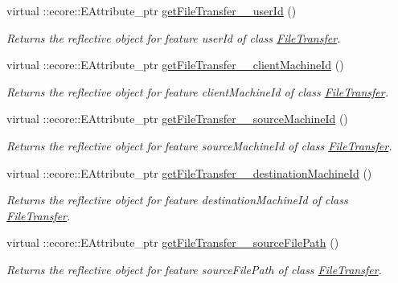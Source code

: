 \begin{DoxyCompactItemize}
virtual ::ecore::EAttribute\_\-ptr \hyperlink{classFMS__Data_1_1FMS__DataPackage_a4089f883855fc62ef871daaab37e93a5}{getFileTransfer\_\-\_\-userId} ()
\begin{DoxyCompactList}\small\item\em Returns the reflective object for feature userId of class \hyperlink{classFMS__Data_1_1FileTransfer}{FileTransfer}. \item\end{DoxyCompactList}\item 
virtual ::ecore::EAttribute\_\-ptr \hyperlink{classFMS__Data_1_1FMS__DataPackage_a05572e2fdfe8de648e30c853241ac4ca}{getFileTransfer\_\-\_\-clientMachineId} ()
\begin{DoxyCompactList}\small\item\em Returns the reflective object for feature clientMachineId of class \hyperlink{classFMS__Data_1_1FileTransfer}{FileTransfer}. \item\end{DoxyCompactList}\item 
virtual ::ecore::EAttribute\_\-ptr \hyperlink{classFMS__Data_1_1FMS__DataPackage_ade57a79f24eff6b9f0ce94bc44c00b85}{getFileTransfer\_\-\_\-sourceMachineId} ()
\begin{DoxyCompactList}\small\item\em Returns the reflective object for feature sourceMachineId of class \hyperlink{classFMS__Data_1_1FileTransfer}{FileTransfer}. \item\end{DoxyCompactList}\item 
virtual ::ecore::EAttribute\_\-ptr \hyperlink{classFMS__Data_1_1FMS__DataPackage_a3b497a87de0a88576ca3580626463628}{getFileTransfer\_\-\_\-destinationMachineId} ()
\begin{DoxyCompactList}\small\item\em Returns the reflective object for feature destinationMachineId of class \hyperlink{classFMS__Data_1_1FileTransfer}{FileTransfer}. \item\end{DoxyCompactList}\item 
virtual ::ecore::EAttribute\_\-ptr \hyperlink{classFMS__Data_1_1FMS__DataPackage_afe0dc5d055cb06d8b501871c71ff05a3}{getFileTransfer\_\-\_\-sourceFilePath} ()
\begin{DoxyCompactList}\small\item\em Returns the reflective object for feature sourceFilePath of class \hyperlink{classFMS__Data_1_1FileTransfer}{FileTransfer}. \item\end{DoxyCompactList}\item 

\end{DoxyCompactItemize}
